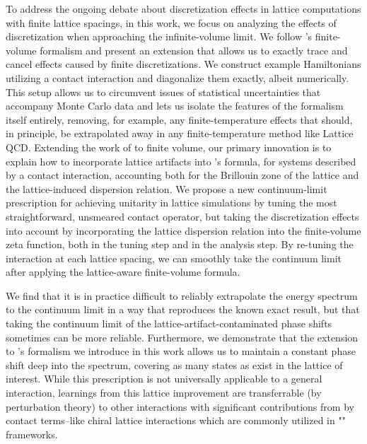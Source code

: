 To address the ongoing debate about discretization effects in lattice computations with finite lattice spacings, in this work, we focus on analyzing the effects of discretization when approaching the infinite-volume limit.
We follow \Luscher's finite-volume formalism and present an extension that allows us to exactly trace and cancel effects caused by finite discretizations.
We construct example Hamiltonians utilizing a contact interaction and diagonalize them exactly, albeit numerically.
This setup allows us to circumvent issues of statistical uncertainties that accompany Monte Carlo data and lets us isolate the features of the formalism itself entirely, removing, for example, any finite-temperature effects that should, in principle, be extrapolated away in any finite-temperature method like Lattice QCD.
Extending the work of  to finite volume, our primary innovation is to explain how to incorporate lattice artifacts into \Luscher's formula, for systems described by a contact interaction, accounting both for the Brillouin zone of the lattice and the lattice-induced dispersion relation.
We propose a new continuum-limit prescription for achieving unitarity in lattice simulations by tuning the most straightforward, unsmeared contact operator, but taking the discretization effects into account by incorporating the lattice dispersion relation into the finite-volume zeta function, both in the tuning step and in the analysis step.
By re-tuning the interaction at each lattice spacing, we can smoothly take the continuum limit after applying the lattice-aware finite-volume formula.

We find that it is in practice difficult to reliably extrapolate the energy spectrum to the continuum limit in a way that reproduces the known exact result, but that taking the continuum limit of the lattice-artifact-contaminated phase shifts sometimes can be more reliable.
Furthermore, we demonstrate that the extension to \Luscher's formalism we introduce in this work allows us to maintain a constant phase shift deep into the spectrum, covering as many \Aoneg states as exist in the lattice of interest.
While this prescription is not universally applicable to a general interaction, learnings from this lattice improvement are transferrable (by perturbation theory) to other interactions with significant contributions from by contact terms--like chiral lattice interactions which are commonly utilized in "" frameworks.

